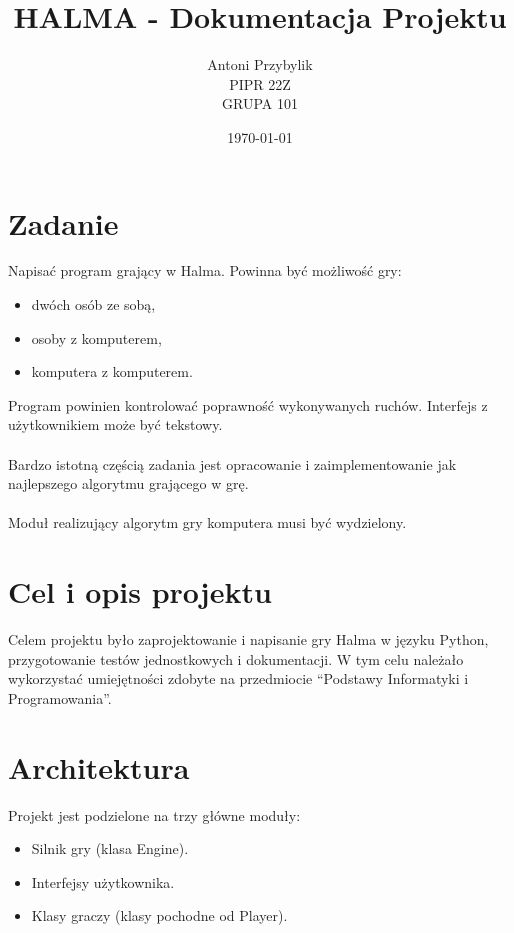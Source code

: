 \documentclass[12pt, titlepage]{article}
\author{Antoni Przybylik\\ PIPR 22Z\\ GRUPA 101}
\date{\today}
\title{HALMA - Dokumentacja Projektu}
\begin{document}
\maketitle
\justifying

\section{Zadanie}
Napisać program grający w Halma. Powinna być możliwość gry:

\begin{itemize}
\item dwóch osób ze sobą,
\item osoby z komputerem,
\item komputera z komputerem.
\end{itemize}

\noindent
Program powinien kontrolować poprawność wykonywanych ruchów. Interfejs z użytkownikiem może być tekstowy.
\\~\\
Bardzo istotną częścią zadania jest opracowanie i zaimplementowanie jak najlepszego algorytmu grającego w grę.
\\~\\
Moduł realizujący algorytm gry komputera musi być wydzielony.

\section{Cel i opis projektu}
Celem projektu było zaprojektowanie i napisanie gry Halma w
języku Python,
przygotowanie testów jednostkowych i dokumentacji.
W tym celu należało wykorzystać umiejętności zdobyte
na przedmiocie "`Podstawy Informatyki i Programowania"'.

\pagebreak
\section{Architektura}
Projekt jest podzielone na trzy główne moduły:
\begin{itemize}
	\item Silnik gry (klasa Engine).
	\item Interfejsy użytkownika.
	\item Klasy graczy (klasy pochodne od Player).
\end{itemize}
\end{document}
